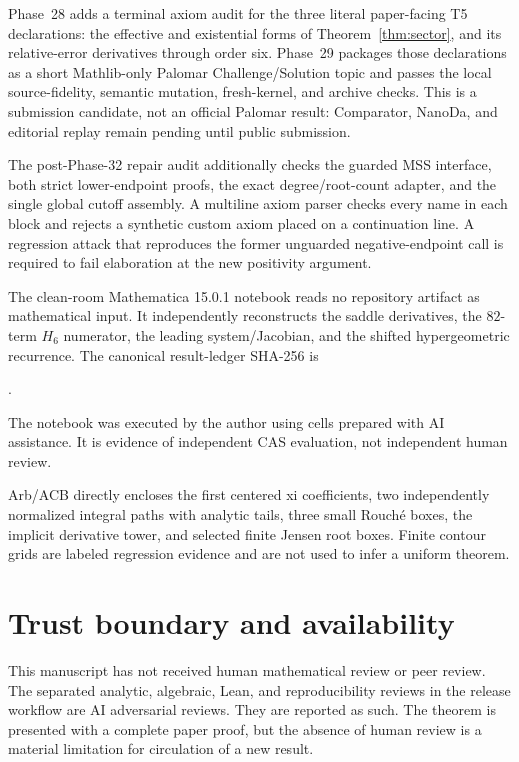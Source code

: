 \documentclass[12pt]{article}
\begin{document}
Phase~28 adds a terminal axiom audit for the three literal paper-facing T5
declarations: the effective and existential forms of
Theorem~\ref{thm:sector}, and its relative-error derivatives through order
six.  Phase~29 packages those declarations as a short Mathlib-only Palomar
Challenge/Solution topic and passes the local source-fidelity, semantic
mutation, fresh-kernel, and archive checks.  This is a submission candidate,
not an official Palomar result: Comparator, NanoDa, and editorial replay
remain pending until public submission.

The post-Phase-32 repair audit additionally checks the guarded MSS interface,
both strict lower-endpoint proofs, the exact degree/root-count adapter, and
the single global cutoff assembly.  A multiline axiom parser checks every
name in each  block and rejects a synthetic custom axiom
placed on a continuation line.  A regression attack that reproduces the
former unguarded negative-endpoint call is required to fail elaboration at
the new positivity argument.

The clean-room Mathematica 15.0.1 notebook reads no repository artifact as
mathematical input.  It independently reconstructs the saddle derivatives,
the $82$-term $H_6$ numerator, the leading system/Jacobian, and the shifted
hypergeometric recurrence.  The canonical result-ledger SHA-256 is
\begin{center}
.
\end{center}
The notebook was executed by the author using cells prepared with AI
assistance.  It is evidence of independent CAS evaluation, not independent
human review.

Arb/ACB directly encloses the first centered xi coefficients, two
independently normalized integral paths with analytic tails, three small
Rouch\'e boxes, the implicit derivative tower, and selected finite Jensen
root boxes.  Finite contour grids are labeled regression evidence and are
not used to infer a uniform theorem.

\section{Trust boundary and availability}\label{sec:trust}

This manuscript has not received human mathematical review or peer review.
The separated analytic, algebraic, Lean, and reproducibility reviews in the
release workflow are AI adversarial reviews.  They are reported as such.
The theorem is presented with a complete paper proof, but the absence of
human review is a material limitation for circulation of a new result.
\end{document}
